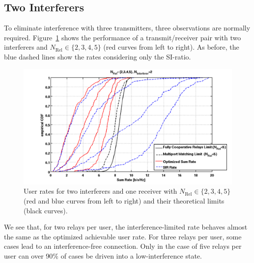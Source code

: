 \subsection{Two Interferers}
\label{sec:2interf}
To eliminate interference with three transmitters, three observations are normally required.
Figure~\ref{fig:relcomp_2} shows the performance of a transmit/receiver pair with two interferers and $N_\text{Rel}\in\{2,3,4,5\}$ (red curves from left to right).
As before, the blue dashed lines show the rates considering only the SI-ratio.
\begin{figure}[h]
\centering
  \includegraphics[width=0.9\linewidth]{images/Relcomparison_2interferer.png}
\caption{User rates for two interferers and one receiver with  $N_\text{Rel}\in\{2,3,4,5\}$ (red and blue curves from left to right) and their theoretical limits (black curves).}
\label{fig:relcomp_2}
\end{figure}

We see that, for two relays per user, the interference-limited rate behaves almost the same as the optimized achievable user rate.
For three relays per user, some cases lead to an interference-free connection.
Only in the case of five relays per user can over 90\% of cases be driven into a low-interference state.

